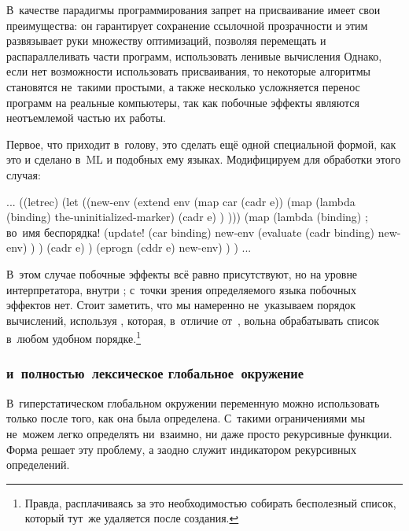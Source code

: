 В~качестве парадигмы программирования запрет на присваивание имеет свои
преимущества: он гарантирует сохранение ссылочной прозрачности и этим
развязывает руки множеству оптимизаций, позволяя перемещать и распараллеливать
части программ, использовать ленивые вычисления {\itd} Однако, если нет
возможности использовать присваивания, то некоторые алгоритмы становятся
не~такими простыми, а также несколько усложняется перенос программ на реальные
компьютеры, так как побочные эффекты являются неотъемлемой частью их работы.

Первое, что приходит в~голову, это сделать  ещё одной специальной
формой, как это и сделано в~ML и подобных ему языках. Модифицируем 
для обработки этого случая:

\begin{code:lisp}
...
((letrec)
 (let ((new-env (extend env
                        (map car (cadr e))
                        (map (lambda (binding) the-uninitialized-marker)
                             (cadr e) ) )))
      (map (lambda (binding)         ;  во~имя беспорядка!
             (update! (car binding)
                      new-env
                      (evaluate (cadr binding) new-env) ) )
           (cadr e) )
      (eprogn (cddr e) new-env) ) ) ...
\end{code:lisp}

В~этом случае побочные эффекты всё равно присутствуют, но на уровне
интерпретатора, внутри ; с~точки зрения определяемого языка побочных
эффектов нет. Стоит заметить, что мы намеренно не~указываем порядок вычислений,
используя , которая, в~отличие от~, вольна обрабатывать
список в~любом удобном порядке.\footnote*{Правда, расплачиваясь за это
необходимостью собирать бесполезный список, который тут~же удаляется после
создания.}


\subsubsection{\texorpdfstring%
{\protect{} и~полностью~лексическое глобальное~окружение}%
{letrec и полностью лексическое глобальное окружение}}

В~гиперстатическом глобальном окружении переменную можно использовать только
после того, как она была определена. С~такими ограничениями мы не~можем легко
определять ни~взаимно, ни даже просто рекурсивные функции. Форма 
решает эту проблему, а заодно служит индикатором рекурсивных определений.

